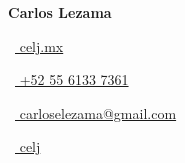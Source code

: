\begin{large}
	\textbf{Carlos Lezama}
\end{large}

\vspace*{0.25em}

\begin{footnotesize}
	\begin{tiny}\faMousePointer\end{tiny}~\href{https://celj.mx/}{
		celj.mx
	}
	\quad\begin{tiny}\faMobile*\end{tiny}~\href{tel:+525561337361}{
		+52 55 6133 7361
	}
	\quad \begin{tiny}\faEnvelope[regular]\end{tiny}~\href{mailto:carloselezama@gmail.com}{
		carloselezama@gmail.com
	}
	\quad\begin{tiny}\faGithub\end{tiny}~\href{https://github.com/celj/}{
		celj
	}
\end{footnotesize}
